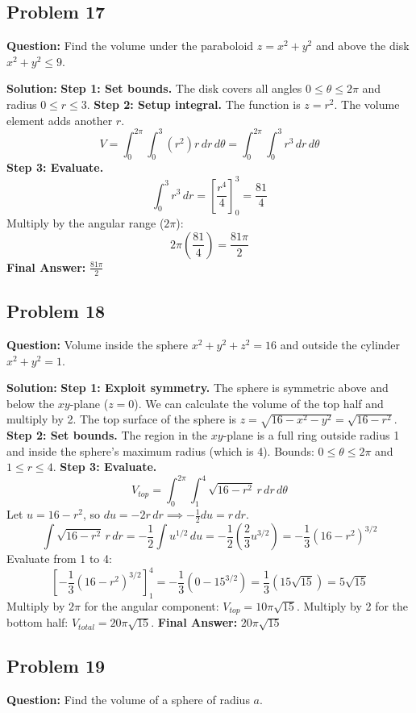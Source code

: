 \documentclass[12pt]{article}
\begin{document}
\subsection*{Problem 17}
\textbf{Question:} Find the volume under the paraboloid $z = x^2+y^2$ and above the disk $x^2+y^2 \le 9$.

\textbf{Solution:}
\textbf{Step 1: Set bounds.}
The disk covers all angles $0 \le \theta \le 2\pi$ and radius $0 \le r \le 3$.
\textbf{Step 2: Setup integral.}
The function is $z = r^2$. The volume element adds another $r$.
\[ V = \int_0^{2\pi} \int_0^3 (r^2)r \, dr \, d\theta = \int_0^{2\pi} \int_0^3 r^3 \, dr \, d\theta \]
\textbf{Step 3: Evaluate.}
\[ \int_0^3 r^3 \, dr = \left[ \frac{r^4}{4} \right]_0^3 = \frac{81}{4} \]
Multiply by the angular range ($2\pi$):
\[ 2\pi \left( \frac{81}{4} \right) = \frac{81\pi}{2} \]
\textbf{Final Answer:} $\frac{81\pi}{2}$

\subsection*{Problem 18}
\textbf{Question:} Volume inside the sphere $x^2+y^2+z^2=16$ and outside the cylinder $x^2+y^2=1$.

\textbf{Solution:}
\textbf{Step 1: Exploit symmetry.}
The sphere is symmetric above and below the $xy$-plane ($z=0$). We can calculate the volume of the top half and multiply by 2.
The top surface of the sphere is $z = \sqrt{16 - x^2 - y^2} = \sqrt{16 - r^2}$.
\textbf{Step 2: Set bounds.}
The region in the $xy$-plane is a full ring outside radius 1 and inside the sphere's maximum radius (which is 4). 
Bounds: $0 \le \theta \le 2\pi$ and $1 \le r \le 4$.
\textbf{Step 3: Evaluate.}
\[ V_{top} = \int_0^{2\pi} \int_1^4 \sqrt{16-r^2} \, r \, dr \, d\theta \]
Let $u = 16-r^2$, so $du = -2r \, dr \implies -\frac{1}{2}du = r \, dr$.
\[ \int \sqrt{16-r^2} \, r \, dr = -\frac{1}{2} \int u^{1/2} \, du = -\frac{1}{2} \left( \frac{2}{3}u^{3/2} \right) = -\frac{1}{3}(16-r^2)^{3/2} \]
Evaluate from 1 to 4:
\[ \left[ -\frac{1}{3}(16-r^2)^{3/2} \right]_1^4 = -\frac{1}{3}(0 - 15^{3/2}) = \frac{1}{3}(15\sqrt{15}) = 5\sqrt{15} \]
Multiply by $2\pi$ for the angular component: $V_{top} = 10\pi\sqrt{15}$.
Multiply by 2 for the bottom half: $V_{total} = 20\pi\sqrt{15}$.
\textbf{Final Answer:} $20\pi\sqrt{15}$

\subsection*{Problem 19}
\textbf{Question:} Find the volume of a sphere of radius $a$.
\end{document}
